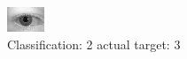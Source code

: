 \begin{figure}[h!]
\begin{center}
\includegraphics[width=0.60\columnwidth]{figures/ID593_class_2_target_3.png}
\end{center}
\caption{ Classification: 2 actual target: 3}
\label{fig:ID593_class_2_target_3}
\end{figure}
